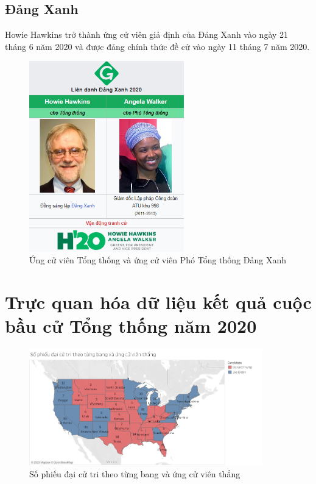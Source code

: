 \documentclass[14pt, a4paper]{article}
\numberwithin{equation}{section}
\numberwithin{figure}{section}
\numberwithin{dl}{section}
\numberwithin{md}{section}
\numberwithin{bd}{section}
\numberwithin{dn}{section}
\numberwithin{hq}{section}
\begin{document}
    \subsection{Đảng Xanh}

    Howie Hawkins trở thành ứng cử viên giả định của Đảng Xanh vào ngày 21 tháng 6 năm 2020 và được đảng chính thức đề cử vào ngày 11 tháng 7 năm 2020.

    \begin{figure}[h!]
        \centering
        \includegraphics[width=0.6\textwidth]{Green_Candidates.png}
        \caption{Ứng cử viên Tổng thống và ứng cử viên Phó Tổng thống Đảng Xanh}
    \end{figure}

    \section{Trực quan hóa dữ liệu kết quả cuộc bầu cử Tổng thống năm 2020}


    \begin{figure}[h!]
        \centering
        \includegraphics[width=0.9\textwidth]{Electoral_Votes_States.png}
        \caption{Số phiếu đại cử tri theo từng bang và ứng cử viên thắng}
    \end{figure}
\end{document}
